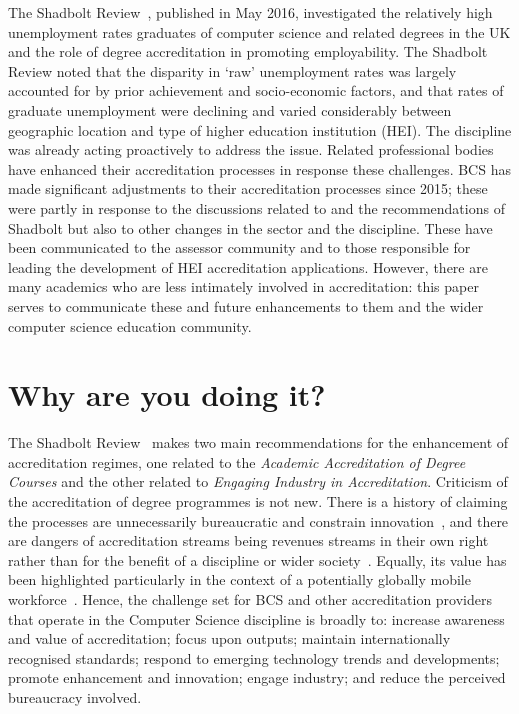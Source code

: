 \documentclass[sigconf]{acmart}
\begin{document}
The Shadbolt Review~\cite{shadbolt2016shadbolt}, published in May
2016, investigated the relatively high unemployment rates graduates of
computer science and related degrees in the UK and the role of degree
accreditation in promoting employability. The Shadbolt Review noted
that the disparity in `raw' unemployment rates was largely accounted
for by prior achievement and socio-economic factors, and that rates of
graduate unemployment were declining and varied considerably between
geographic location and type of higher education institution
(HEI). The discipline was already acting proactively to address the
issue.  Related professional bodies have enhanced their accreditation
processes in response these challenges. BCS has made significant
adjustments to their accreditation processes since 2015; these were
partly in response to the discussions related to and the
recommendations of Shadbolt but also to other changes in the sector
and the discipline.  These have been communicated to the assessor
community and to those responsible for leading the development of HEI
accreditation applications. However, there are many academics who are
less intimately involved in accreditation: this paper serves to
communicate these and future enhancements to them and the wider
computer science education community.

\vspace{-1em}
\section {Why are you doing it?}	

The Shadbolt Review~\cite[p.~8]{shadbolt2016shadbolt} makes two main
recommendations for the enhancement of accreditation regimes, one
related to the {\emph{Academic Accreditation of Degree Courses}} and
the other related to {\emph{Engaging Industry in
Accreditation}}. Criticism of the accreditation of degree programmes
is not new. There is a history of claiming the processes are
unnecessarily bureaucratic and constrain innovation~\cite{Harvey2004},
and there are dangers of accreditation streams being revenues streams
in their own right rather than for the benefit of a discipline or
wider society~\cite{Knight_2015}. Equally, its value has been
highlighted particularly in the context of a potentially globally
mobile workforce~\cite{Knight_2015}. Hence, the challenge set for BCS
and other accreditation providers that operate in the Computer Science
discipline is broadly to: increase awareness and value of
accreditation; focus upon outputs; maintain internationally recognised
standards; respond to emerging technology trends and developments;
promote enhancement and innovation; engage industry; and reduce the
perceived bureaucracy involved.
\end{document}
